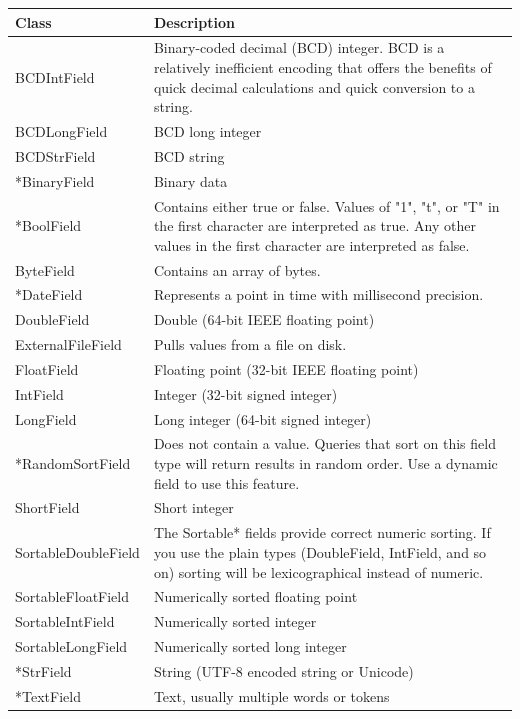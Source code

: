 \begin{longtable}{| p{4cm} | p{11cm} |}
    \hline
    Class & Description \\ \hline
    BCDIntField & Binary-coded decimal (BCD) integer. BCD is a relatively inefficient 
    encoding that offers the benefits of quick decimal calculations and quick conversion to a string. \\ \hline
    BCDLongField & BCD long integer \\ \hline
    BCDStrField & BCD string \\ \hline
    *BinaryField & Binary data \\ \hline
    *BoolField & Contains either true or false. Values of "1", "t", or "T" in the first character are interpreted as true. Any other values in the first character are interpreted as false. \\ \hline
    ByteField & Contains an array of bytes. \\ \hline
    *DateField & Represents a point in time with millisecond precision. \\ \hline
    DoubleField & Double (64-bit IEEE floating point) \\ \hline
    ExternalFileField & Pulls values from a file on disk. \\ \hline
    FloatField & Floating point (32-bit IEEE floating point) \\ \hline
    IntField & Integer (32-bit signed integer) \\ \hline
    LongField & Long integer (64-bit signed integer) \\ \hline
    *RandomSortField & Does not contain a value. Queries that sort on this field type will return results in random order. Use a dynamic field to use this feature. \\ \hline
    ShortField & Short integer \\ \hline
    SortableDoubleField & The Sortable* fields provide correct numeric sorting. If you use the plain types (DoubleField, IntField, and so on) sorting will be lexicographical instead of numeric. \\ \hline
    SortableFloatField & Numerically sorted floating point \\ \hline
    SortableIntField & Numerically sorted integer \\ \hline
    SortableLongField & Numerically sorted long integer \\ \hline
    *StrField & String (UTF-8 encoded string or Unicode) \\ \hline
    *TextField & Text, usually multiple words or tokens \\ \hline

\end{longtable}
